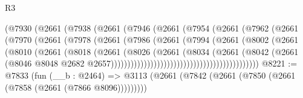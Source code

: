 \begin{lexlean}{R3}
\begin{coremodule}
                                (@7930
                                  (@2661
                                    (@7938
                                      (@2661
                                        (@7946
                                          (@2661
                                            (@7954
                                              (@2661
                                                (@7962
                                                  (@2661
                                                    (@7970
                                                      (@2661
                                                        (@7978
                                                          (@2661
                                                            (@7986
                                                              (@2661
                                                                (@7994
                                                                  (@2661
                                                                    (@8002
                                                                      (@2661
                                                                        (@8010
                                                                          (@2661
                                                                            (@8018
                                                                              (@2661
                                                                                (@8026
                                                                                  (@2661
                                                                                    (@8034
                                                                                      (@2661
                                                                                        (@8042
                                                                                          (@2661
                                                                                            (@8046
                                                                                              @8048
                                                                                              @2682
                                                                                              @2657)))))))))))))))))))))))))))))))))))))))))))))
@8221 := @7833
    (fun (__b : @2464) =>
    @3113 (@2661 (@7842 (@2661 (@7850 (@2661 (@7858 (@2661 (@7866 @8096)))))))))

\end{coremodule}
\end{lexlean}
